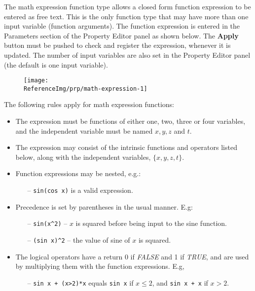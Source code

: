 
The math expression function type allows a closed form function expression to be
entered as free text. This is the only function type that may have more than one
input variable (function arguments). The function expression is entered in the
Parameters section of the Property Editor panel as shown below.
The \textbf{Apply} button must be pushed to check and register the expression,
whenever it is updated. The number of input variables are also set in the
Property Editor panel (the default is one input variable).

\begin{figure}[H]
  \texttt{[image: \\ReferenceImg/prp/math-expression-1]}
\end{figure}

The following rules apply for  math expression functions:

\begin{itemize}
\item
  The expression must be functions of either one, two, three or four
  variables, and the independent variable must be named $x,y,z$ and $t$.
\item
  The expression may consist of the intrinsic functions and operators listed
  below, along with the independent variables, $\{x,y,z,t\}$.
\item
  Function expressions may be nested, e.g.:
  \begin{itemize}
  \item[--]
    {\tt sin(cos x)} is a valid expression.
  \end{itemize}
\item
  Precedence is set by parentheses in the usual manner. E.g:
  \begin{itemize}
  \item[--]
    {\tt sin(x\^{}2)} -- $x$ is squared before being input to the sine function.
  \item[--]
    {\tt(sin x)\^{}2} -- the value of sine of $x$ is squared.
  \end{itemize}
\item
  The logical operators have a return 0 if {\sl FALSE} and 1 if {\sl TRUE},
  and are used by multiplying them with the function expressions. E.g,
  \begin{itemize}
  \item[--]
    {\tt sin x + (x\textgreater2)*x} equals {\tt sin x} if $x\le2$,
    and {\tt sin x + x} if $x>2$.
  \end{itemize}
\end{itemize}

